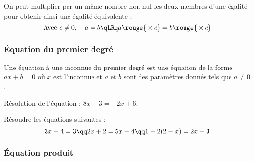 \documentclass[xcolor={dvipsnames,svgnames,table}]{beamer}
\begin{document}
\begin{frame}
    \begin{Proof}
        \rule{0pt}{5cm}
    \end{Proof}
\end{frame}

\begin{frame}
    \begin{Prop}
        On peut multiplier par un même nombre non nul les deux membres d'une égalité pour obtenir ainsi une égalité équivalente :
        \[\text{Avec } c\neq 0,\quad a = b \qLRq a \rouge{\,\times\,c} = b \rouge{\,\times\,c}\]
    \end{Prop}
\pause
    \begin{Proof}
        \rule{0pt}{4cm}
    \end{Proof}
\end{frame}

\subsubsection{\'Equation du premier degré}

\begin{frame}
    \begin{definition}
        Une \alert{équation à une inconnue du premier degré} est une équation de la forme $ax + b = 0$ où $x$ est l'inconnue et $a$ et $b$ sont des paramètres donnés tels que $a \neq 0$.\par
    \end{definition}
\end{frame}

\begin{frame}
    \begin{Example}
        Résolution de l'équation : $8x - 3 = -2x + 6$.\par
        \rule{0pt}{6cm}
    \end{Example}
\end{frame}

\begin{frame}
    \begin{Examples}
        Résoudre les équations suivantes :
        \[3x - 4 = 3 \qq 2x + 2 = 5x - 4 \qq 1 - 2(2 - x) = 2x - 3\]
        \rule{0pt}{4cm}
    \end{Examples}
\end{frame}

\subsubsection{\'Equation produit}
\end{document}
